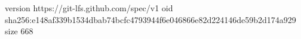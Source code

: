 version https://git-lfs.github.com/spec/v1
oid sha256:e148af339b1534dbab74bcfc4793944f6e046866e82d224146de59b2d174a929
size 668
